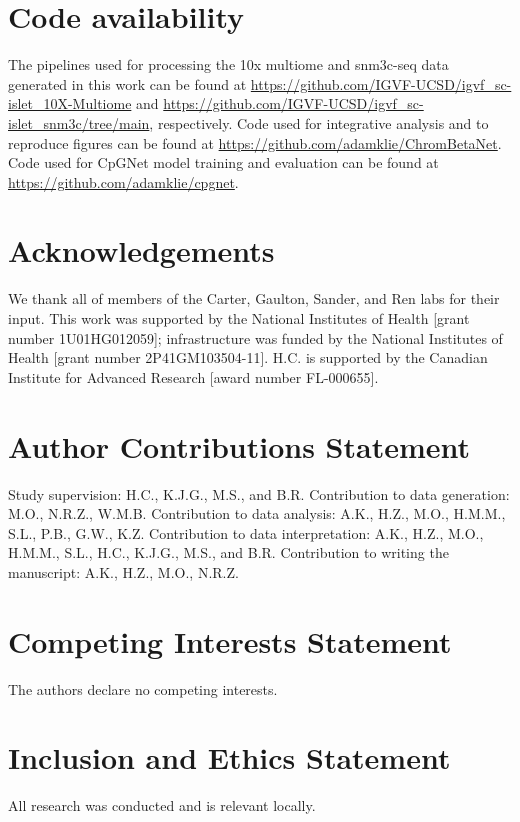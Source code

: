 \section{Code availability}

The pipelines used for processing the 10x multiome and snm3c-seq data generated in this work can be found at \url{https://github.com/IGVF-UCSD/igvf_sc-islet_10X-Multiome} and \url{https://github.com/IGVF-UCSD/igvf_sc-islet_snm3c/tree/main}, respectively. Code used for integrative analysis and to reproduce figures can be found at \url{https://github.com/adamklie/ChromBetaNet}. Code used for CpGNet model training and evaluation can be found at \url{https://github.com/adamklie/cpgnet}.

\section{Acknowledgements}

We thank all of members of the Carter, Gaulton, Sander, and Ren labs for their input. This work was supported by the National Institutes of Health [grant number 1U01HG012059]; infrastructure was funded by the National Institutes of Health [grant number 2P41GM103504-11]. H.C. is supported by the Canadian Institute for Advanced Research [award number FL-000655].

\section{Author Contributions Statement}

Study supervision: H.C., K.J.G., M.S., and B.R. Contribution to data generation: M.O., N.R.Z., W.M.B. Contribution to data analysis: A.K., H.Z., M.O., H.M.M., S.L., P.B., G.W., K.Z. Contribution to data interpretation: A.K., H.Z., M.O., H.M.M., S.L., H.C., K.J.G., M.S., and B.R. Contribution to writing the manuscript: A.K., H.Z., M.O., N.R.Z.

\section{Competing Interests Statement}

The authors declare no competing interests.

\section{Inclusion and Ethics Statement}

All research was conducted and is relevant locally.
